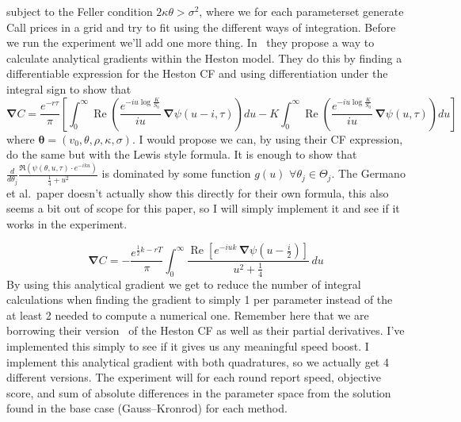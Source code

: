 subject to the Feller condition $2\kappa\theta > \sigma^2$,
where we for each parameterset generate Call prices in a grid and try to fit using the different ways of integration. Before we run the experiment we'll add one more thing.
In~\cite{germano2017} they propose a way to calculate analytical gradients within the Heston model. They do this by finding a differentiable expression for the Heston CF and using differentiation under the integral sign to show that
\begin{equation}
\boldsymbol{\nabla} C= \frac{e^{-r\tau}}{\pi}\left[
\int_0^\infty \operatorname{Re}\!\left(\frac{e^{-iu\log\frac{K}{S_0}}}{iu}\,\boldsymbol{\nabla}\psi(u-i,\tau)\right)du
- K\int_0^\infty \operatorname{Re}\!\left(\frac{e^{-iu\log\frac{K}{S_0}}}{iu}\,\boldsymbol{\nabla}\psi(u,\tau)\right)du
\right]
\end{equation}
where $\boldsymbol{\theta}=(v_0,\theta,\rho,\kappa,\sigma)$. I would propose we can, by using their CF expression,
do the same but with the Lewis style formula. It is enough to show that $\frac{d}{d\theta_j}\frac{\Re(\psi(\theta,u,\tau)\cdot e^{-iku})}{\frac{1}{4}+u^2}$ is dominated by some function
$g(u)$ $\forall\theta_j\in\Theta_j$. The Germano et al.\ paper doesn't actually show this directly for their own formula, this also seems a bit out of scope for this paper, so I will simply
implement it and see if it works in the experiment.

\begin{equation}
\boldsymbol{\nabla} C = -\frac{e^{\frac{1}{2}k - rT}}{\pi}
\int_0^\infty \frac{\operatorname{Re}\!\left[e^{-iuk}\,\boldsymbol{\nabla}\psi\!\left(u-\tfrac{i}{2}\right)\right]}{u^2+\tfrac{1}{4}}\,du
\end{equation}
By using this analytical gradient we get to reduce the number of integral calculations when finding the gradient to simply 1 per parameter instead of the at least 2 needed to compute a numerical one.
Remember here that we are borrowing their version~\cite{germano2017} of the Heston CF as well as their partial derivatives. I've implemented this simply to see if it gives us any meaningful speed boost. I implement this
analytical gradient with both quadratures, so we actually get 4 different versions. The experiment will for each round report speed, objective score, and sum of absolute differences in the parameter space
from the solution found in the base case (Gauss--Kronrod) for each method.


